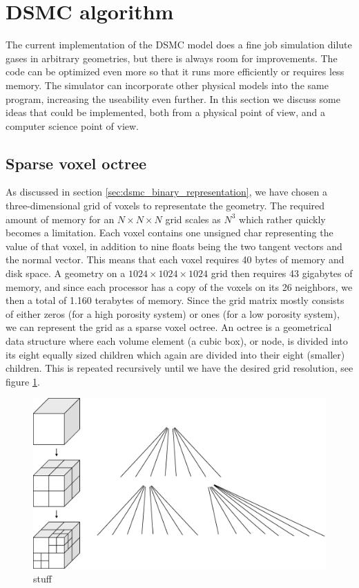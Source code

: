 \section{DSMC algorithm}
The current implementation of the DSMC model does a fine job simulation dilute gases in arbitrary geometries, but there is always room for improvements. The code can be optimized even more so that it runs more efficiently or requires less memory. The simulator can incorporate other physical models into the same program, increasing the useability even further. In this section we discuss some ideas that could be implemented, both from a physical point of view, and a computer science point of view.
\subsection{Sparse voxel octree}
As discussed in section \ref{sec:dsmc_binary_representation}, we have chosen a three-dimensional grid of voxels to representate the geometry. The required amount of memory for an $N\times N\times N$ grid scales as $N^3$ which rather quickly becomes a limitation. Each voxel contains one unsigned char representing the value of that voxel, in addition to nine floats being the two tangent vectors and the normal vector. This means that each voxel requires 40 bytes of memory and disk space. A geometry on a $1024\times1024\times1024$ grid then requires 43 gigabytes of memory, and since each processor has a copy of the voxels on its 26 neighbors, we then a total of 1.160 terabytes of memory. Since the grid matrix mostly consists of either zeros (for a high porosity system) or ones (for a low porosity system), we can represent the grid as a sparse voxel octree\cite{laine2011efficient}. An octree is a geometrical data structure where each volume element (a cubic box), or node, is divided into its eight equally sized children which again are divided into their eight (smaller) children.  This is repeated recursively until we have the desired grid resolution, see figure \ref{fig:future_work_octree}. 
\begin{figure}[h]
\begin{center}
\includegraphics[width=\textwidth, trim=0cm 0cm 0cm 0cm, clip]{figures/octree.eps}
\end{center}
\caption{stuff}
\label{fig:future_work_octree}
\end{figure}

